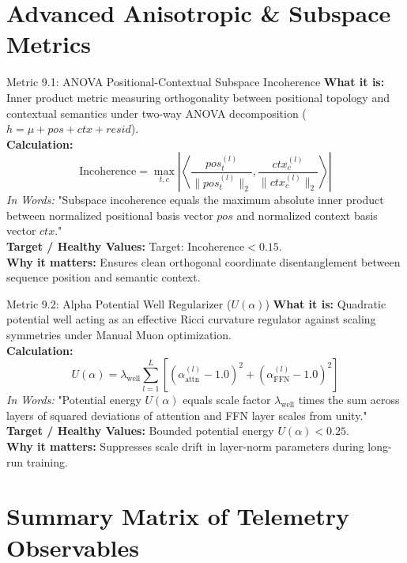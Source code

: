 \documentclass[10pt,a4paper]{article}
\begin{document}
\section{Advanced Anisotropic \& Subspace Metrics}

\begin{metricbox}{Metric 9.1: ANOVA Positional-Contextual Subspace Incoherence}
\textbf{What it is:} Inner product metric measuring orthogonality between positional topology and contextual semantics under two-way ANOVA decomposition ($h = \mu + pos + ctx + resid$).\\
\textbf{Calculation:}
$$\text{Incoherence} = \max_{t, c} \left| \left\langle \frac{pos_t^{(l)}}{\|pos_t^{(l)}\|_2}, \frac{ctx_c^{(l)}}{\|ctx_c^{(l)}\|_2} \right\rangle \right|$$
\emph{In Words:} "Subspace incoherence equals the maximum absolute inner product between normalized positional basis vector $pos$ and normalized context basis vector $ctx$."\\
\textbf{Target / Healthy Values:} Target: $\text{Incoherence} < 0.15$.\\
\textbf{Why it matters:} Ensures clean orthogonal coordinate disentanglement between sequence position and semantic context.
\end{metricbox}

\begin{metricbox}{Metric 9.2: Alpha Potential Well Regularizer ($U(\alpha)$)}
\textbf{What it is:} Quadratic potential well acting as an effective Ricci curvature regulator against scaling symmetries under Manual Muon optimization.\\
\textbf{Calculation:}
$$U(\alpha) = \lambda_{\text{well}} \sum_{l=1}^L \left[ \left(\alpha_{\text{attn}}^{(l)} - 1.0\right)^2 + \left(\alpha_{\text{FFN}}^{(l)} - 1.0\right)^2 \right]$$
\emph{In Words:} "Potential energy $U(\alpha)$ equals scale factor $\lambda_{\text{well}}$ times the sum across layers of squared deviations of attention and FFN layer scales from unity."\\
\textbf{Target / Healthy Values:} Bounded potential energy $U(\alpha) < 0.25$.\\
\textbf{Why it matters:} Suppresses scale drift in layer-norm parameters during long-run training.
\end{metricbox}

\section{Summary Matrix of Telemetry Observables}
\end{document}
